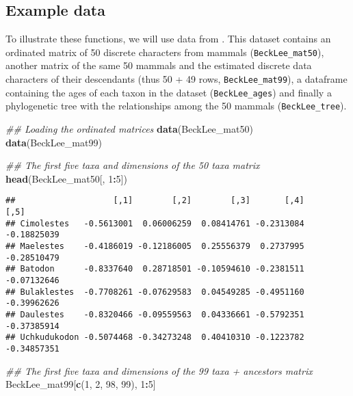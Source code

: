 \documentclass[
]{book}
\newenvironment{Shaded}{\begin{snugshade}}{\end{snugshade}}
\newcommand{\CommentTok}[1]{\textcolor[rgb]{0.56,0.35,0.01}{\textit{#1}}}
\newcommand{\DecValTok}[1]{\textcolor[rgb]{0.00,0.00,0.81}{#1}}
\newcommand{\KeywordTok}[1]{\textcolor[rgb]{0.13,0.29,0.53}{\textbf{#1}}}
\newcommand{\NormalTok}[1]{#1}
\newcommand{\OperatorTok}[1]{\textcolor[rgb]{0.81,0.36,0.00}{\textbf{#1}}}
\begin{document}
\hypertarget{example-data}{%
\subsection{Example data}\label{example-data}}

To illustrate these functions, we will use data from \citet{beckancient2014}.
This dataset contains an ordinated matrix of 50 discrete characters from mammals (\texttt{BeckLee\_mat50}), another matrix of the same 50 mammals and the estimated discrete data characters of their descendants (thus 50 + 49 rows, \texttt{BeckLee\_mat99}), a dataframe containing the ages of each taxon in the dataset (\texttt{BeckLee\_ages}) and finally a phylogenetic tree with the relationships among the 50 mammals (\texttt{BeckLee\_tree}).

\begin{Shaded}
\begin{Highlighting}[]
\CommentTok{\#\# Loading the ordinated matrices}
\KeywordTok{data}\NormalTok{(BeckLee\_mat50)}
\KeywordTok{data}\NormalTok{(BeckLee\_mat99)}

\CommentTok{\#\# The first five taxa and dimensions of the 50 taxa matrix}
\KeywordTok{head}\NormalTok{(BeckLee\_mat50[, }\DecValTok{1}\OperatorTok{:}\DecValTok{5}\NormalTok{])}
\end{Highlighting}
\end{Shaded}

\begin{verbatim}
##                    [,1]        [,2]        [,3]       [,4]        [,5]
## Cimolestes   -0.5613001  0.06006259  0.08414761 -0.2313084 -0.18825039
## Maelestes    -0.4186019 -0.12186005  0.25556379  0.2737995 -0.28510479
## Batodon      -0.8337640  0.28718501 -0.10594610 -0.2381511 -0.07132646
## Bulaklestes  -0.7708261 -0.07629583  0.04549285 -0.4951160 -0.39962626
## Daulestes    -0.8320466 -0.09559563  0.04336661 -0.5792351 -0.37385914
## Uchkudukodon -0.5074468 -0.34273248  0.40410310 -0.1223782 -0.34857351
\end{verbatim}

\begin{Shaded}
\begin{Highlighting}[]
\CommentTok{\#\# The first five taxa and dimensions of the 99 taxa + ancestors matrix}
\NormalTok{BeckLee\_mat99[}\KeywordTok{c}\NormalTok{(}\DecValTok{1}\NormalTok{, }\DecValTok{2}\NormalTok{, }\DecValTok{98}\NormalTok{, }\DecValTok{99}\NormalTok{), }\DecValTok{1}\OperatorTok{:}\DecValTok{5}\NormalTok{]}
\end{Highlighting}
\end{Shaded}
\end{document}
